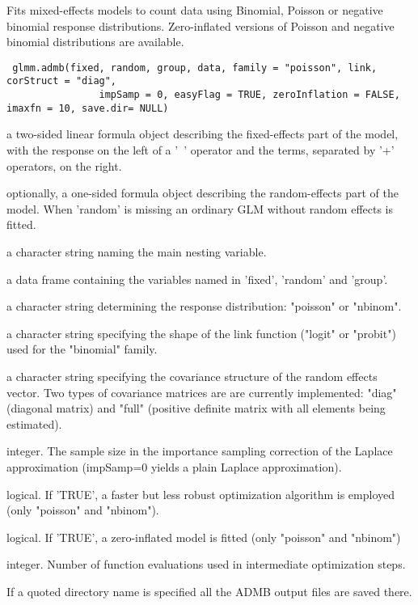 \begin{Description}\relax
Fits mixed-effects models to count data using Binomial, Poisson or
negative binomial response distributions. Zero-inflated versions of 
Poisson and negative binomial distributions are available.
\end{Description}
\begin{Usage}
\begin{verbatim} glmm.admb(fixed, random, group, data, family = "poisson", link, corStruct = "diag", 
                impSamp = 0, easyFlag = TRUE, zeroInflation = FALSE, imaxfn = 10, save.dir= NULL)
\end{verbatim}
\end{Usage}
\begin{Arguments}
\begin{ldescription}
\item[\code{fixed}] a two-sided linear formula object describing the
fixed-effects part of the model, with the response on the
left of a '~' operator and the terms, separated by '+'
operators, on the right.
\item[\code{random}] optionally, a one-sided formula object describing the
random-effects part of the model. When 'random' is missing
an ordinary GLM without random effects is fitted.
\item[\code{group}] a character string naming the main nesting variable.
\item[\code{data}] a data frame containing the variables named in 'fixed', 'random' and 'group'.
\item[\code{family}] a character string determining the response distribution: "poisson" or "nbinom".
\item[\code{link}] a character string specifying the shape of the link function ("logit" or "probit") used for the "binomial" family.
\item[\code{corStruct}] a character string specifying the covariance structure of the random effects vector. 
Two types of covariance matrices are are currently implemented: "diag" (diagonal matrix) and "full"
(positive definite matrix with all elements being estimated).
\item[\code{impSamp}] integer.  The sample size in the importance sampling correction of the Laplace approximation 
(impSamp=0 yields a plain Laplace approximation).
\item[\code{easyFlag}] logical.  If 'TRUE', a faster but less robust optimization algorithm is employed (only "poisson" and "nbinom").
\item[\code{zeroInflation}] logical.  If 'TRUE', a zero-inflated model is fitted (only "poisson" and "nbinom")
\item[\code{imaxfn}] integer. Number of function evaluations used in intermediate optimization steps.
\item[\code{save.dir}] If a quoted directory name is specified all the ADMB output files are saved there.
\end{ldescription}
\end{Arguments}
